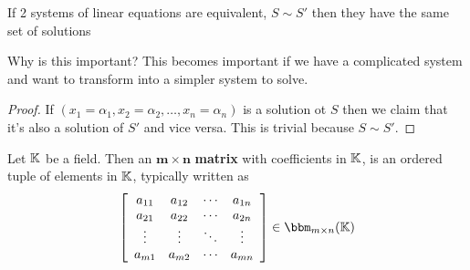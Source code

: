 
\begin{proposition}
    If 2 systems of linear equations are equivalent, \(S \sim S'\) then they have the same set of solutions
\end{proposition}
\begin{remark}
    Why is this important? This becomes important if we have a complicated system and want to transform into a simpler system to solve.
\end{remark}

\begin{proof}
    If \((x_1 = \alpha_1, x_2 = \alpha_2, \dots, x_n = \alpha_n)\) is a solution ot \(S\) then we claim that it's also a solution of \(S'\) and vice versa. This is trivial because \(S \sim S'\).
\end{proof}

\begin{definition} [Matrix]
    Let \(\mathbb{K}\) be a field. Then an \(\mathbf{m \times n}\) \textbf{matrix} with coefficients in \(\mathbb{K}\), is an ordered tuple of elements in \(\mathbb{K}\), typically written as \[
        \left[
            \begin{array}{cccc}
                a_{11} & a_{12} & \cdots & a_{1n} \\
                a_{21} & a_{22} & \cdots & a_{2n} \\
                \vdots & \vdots & \ddots & \vdots \\
                a_{m1} & a_{m2} & \cdots & a_{mn} \\
            \end{array}
            \right] \in \bbm_{m\times n}(\bbk)
    \]
\end{definition}

